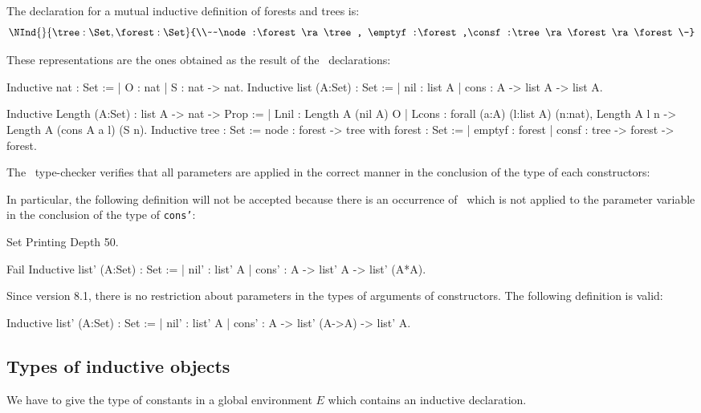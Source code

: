 The declaration for a mutual inductive definition of forests and trees is:
\[\NInd{}{\tree:\Set,\forest:\Set}
      {\\~~\node:\forest \ra \tree,
       \emptyf:\forest,\consf:\tree \ra \forest \ra \forest\-}\]
  
These representations are the ones obtained as the result of the \Coq\ 
declarations:
\begin{coq_example*}
Inductive nat : Set :=
  | O : nat
  | S : nat -> nat.
Inductive list (A:Set) : Set :=
  | nil : list A
  | cons : A -> list A -> list A.
\end{coq_example*}
\begin{coq_example*}
Inductive Length (A:Set) : list A -> nat -> Prop :=
  | Lnil : Length A (nil A) O
  | Lcons :
      forall (a:A) (l:list A) (n:nat),
        Length A l n -> Length A (cons A a l) (S n).
Inductive tree : Set :=
    node : forest -> tree
with forest : Set :=
  | emptyf : forest
  | consf : tree -> forest -> forest.
\end{coq_example*}
The \Coq\ type-checker verifies that all
parameters are applied in the correct manner in the conclusion of the
type of each constructors:

In particular, the following definition will not be accepted because 
there is an occurrence of \List\ which is not applied to the parameter
variable in the conclusion of the type of {\tt cons'}:
\begin{coq_eval}
Set Printing Depth 50.
\end{coq_eval}
\begin{coq_example}
Fail Inductive list' (A:Set) : Set :=
  | nil' : list' A
  | cons' : A -> list' A -> list' (A*A).
\end{coq_example}
Since \Coq{} version 8.1, there is no restriction about parameters in
the types of arguments of constructors. The following definition is
valid:
\begin{coq_example}
Inductive list' (A:Set) : Set :=
  | nil' : list' A
  | cons' : A -> list' (A->A) -> list' A.
\end{coq_example}


\subsection{Types of inductive objects}
We have to give the type of constants in a global environment $E$ which
contains an inductive declaration.

